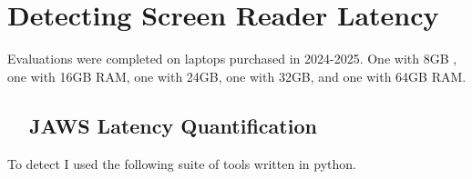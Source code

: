 \chapter{Detecting Screen Reader Latency}\label{chap:computationappendix}

Evaluations were completed on laptops purchased in 2024-2025. One with 8GB , one with 16GB RAM, one with 24GB, one with 32GB, and one with 64GB RAM.

\section{~~JAWS Latency Quantification}
To detect   I used the following suite of tools written in python.

